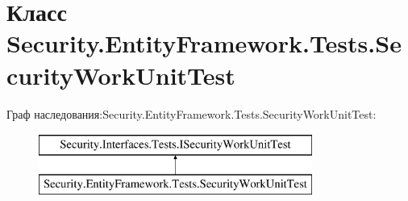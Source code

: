 \hypertarget{class_security_1_1_entity_framework_1_1_tests_1_1_security_work_unit_test}{}\section{Класс Security.\+Entity\+Framework.\+Tests.\+Security\+Work\+Unit\+Test}
\label{class_security_1_1_entity_framework_1_1_tests_1_1_security_work_unit_test}
Граф наследования\+:Security.\+Entity\+Framework.\+Tests.\+Security\+Work\+Unit\+Test\+:\begin{figure}[H]
\begin{center}
\leavevmode
\includegraphics[height=2.000000cm]{d4/d73/class_security_1_1_entity_framework_1_1_tests_1_1_security_work_unit_test}
\end{center}
\end{figure}
